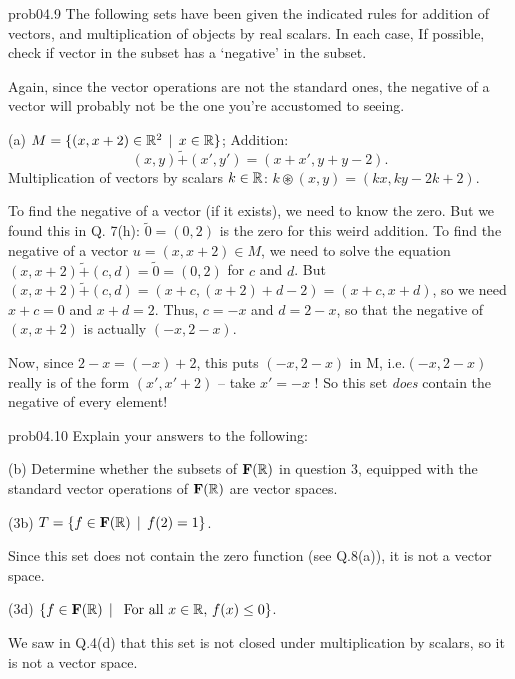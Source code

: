 \begin{sol}{prob04.9}  The following sets have been given   the indicated rules for addition of vectors,  and multiplication of objects  by real scalars. In each case, If possible, check if vector in the subset has a `negative' in the subset. 

Again, since the vector operations are not the standard ones, the negative of a vector will probably not be the one you're accustomed to seeing.
 
\medskip

(a) $M=\{(x, x+2) \in \mathbb{R}^2\,\mid \, x\in \mathbb{R} \}$;  Addition: $$(x,y) \tilde+ (x',y')=(x+x', y+y-2).$$ Multiplication of vectors  by  scalars $k\in \mathbb{R}$: $k\circledast (x,y)=(kx, ky-2k+2)$.    

\soln To find the negative of a vector (if it exists), we need to know the zero. But we found this in  Q. 7(h): $\tilde 0=(0,2)$ is the zero for this weird addition. To find the negative of a vector $u=(x,x+2) \in M $, we need to solve the equation $(x,x+2) \tilde+ (c,d)= \tilde 0=(0,2)$ for $c$ and $d$. But $(x,x+2) \tilde+ (c,d)=(x+c, (x+2) +d-2)=(x+c, x+d) $, so we need $x+c=0$ and $x+d=2$. Thus, $c=-x$ and $d=2-x$, so that the negative of $(x, x+2)$ is actually $(-x, 2-x)$. 

Now, since $2-x =(-x)+2$, this puts $(-x, 2-x)$ in M, i.e.$(-x, 2-x)$ really is of the form $(x', x'+2)$ -- take $x'=-x$ ! So this set {\it does} contain the negative of every element!\medskip
% 


\end{sol} \begin{sol}{prob04.10} Explain your answers to the following:

 
 
\medskip 
% 

(b)  Determine whether the  subsets  of $\mathbf{F}(\mathbb{R})$ in  question 3, equipped with the standard vector operations of  $\mathbf{F}(\mathbb{R})$ are vector spaces. 
\medskip
 
 
 (3b) $T=\{f \in \mathbf{F}(\mathbb{R}) \,\mid \, f(2)=1  \}$. 

\soln Since this set does not contain the zero function (see Q.8(a)), it is not a vector space. \smallskip


(3d) $\{f \in \mathbf{F}(\mathbb{R}) \,\mid \, \text{ For all } x\in \mathbb{R},   \, f(x)\le 0 \}$. 

\soln We saw in Q.4(d) that this set is not closed under multiplication by scalars, so it is not a vector space.\smallskip




\end{sol}
